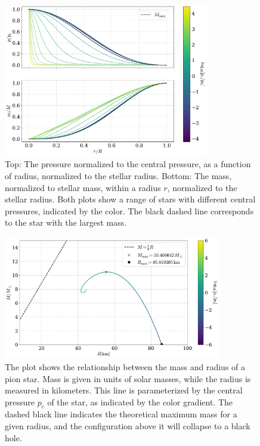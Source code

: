 \begin{figure}[!h]
    \centering
    \includegraphics[width=0.8\textwidth]{../scripts/figurer/pion_star/pressure_mass_pion_star.pdf}
    \caption{
        Top: The pressure normalized to the central pressure, as a function of radius, normalized to the stellar radius.
    Bottom: The mass, normalized to stellar mass, within a radius $r$, normalized to the stellar radius.
    Both plots show a range of stars with different central pressures, indicated by the color.
    The black dashed line corresponds to the star with the largest mass.
    }
    \label{fig: pressure and mass for pion star}
\end{figure}

\begin{figure}[!h]
    \centering
    \includegraphics[width=0.85\textwidth]{../scripts/figurer/pion_star/mass_radius_pion_star.pdf}
    \caption{
        The plot shows the relationship between the mass and radius of a pion star. Mass is given in units of solar masses, while the radius is measured in kilometers.
        This line is parameterized by the central pressure $p_c$ of the star, as indicated by the color gradient.
        The dashed black line indicates the theoretical maximum mass for a given radius, and the configuration above it will collapse to a black hole.
        }
        \label{fig: mass-radius relation pion star}
\end{figure}

